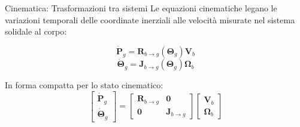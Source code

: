 \documentclass[aspectratio=169]{beamer} %
\begin{document}
\begin{frame}{Cinematica: Trasformazioni tra sistemi}
    Le equazioni cinematiche legano le variazioni temporali delle coordinate inerziali alle velocità misurate nel sistema solidale al corpo:
    
    \begin{equation}
        \bm{\dot{P}}_{g} = \mathbf{R}_{b \to g}(\bm{\Theta}_g) \bm{V}_{b}
    \end{equation}
    \begin{equation}
        \bm{\dot{\Theta}}_{g} = \mathbf{J}_{b \to g}(\bm{\Theta}_g) \bm{\Omega}_{b}
    \end{equation}

    In forma compatta per lo stato cinematico:
    \begin{equation}
        \begin{bmatrix}
            \bm{\dot{P}}_g \\ 
            \bm{\dot{\Theta}}_g
        \end{bmatrix}
        =
        \begin{bmatrix}
            \mathbf{R}_{b \to g} & \mathbf{0} \\ 
            \mathbf{0} & \mathbf{J}_{b \to g}
        \end{bmatrix}
        \begin{bmatrix}
            \bm{V}_b \\
            \bm{\Omega}_b
        \end{bmatrix}
    \end{equation}
\end{frame}
\end{document}
